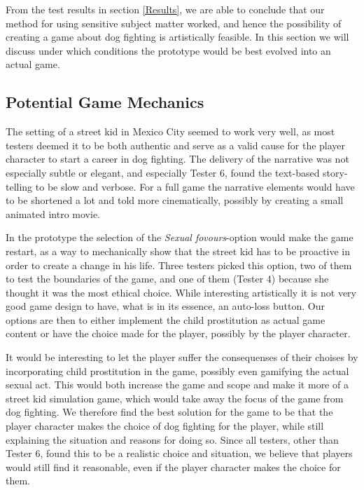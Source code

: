 From the test results in section \ref{Results}, we are able to conclude that our method for using sensitive subject matter worked, and hence the possibility of creating a game about dog fighting is artistically feasible. In this section we will discuss under which conditions the prototype would be best evolved into an actual game.\

\subsection{Potential Game Mechanics}
The setting of a street kid in Mexico City seemed to work very well, as most testers deemed it to be both authentic and serve as a valid cause for the player character to start a career in dog fighting. The delivery of the narrative was not especially subtle or elegant, and especially Tester 6, found the text-based story-telling to be slow and verbose. For a full game the narrative elements would have to be shortened a lot and told more cinematically, possibly by creating a small animated intro movie. \

In the prototype the selection of the \textit{Sexual fovours}-option would make the game restart, as a way to mechanically show that the street kid has to be proactive in order to create a change in his life. Three testers picked this option, two of them to test the boundaries of the game, and one of them (Tester 4) because she thought it was the most ethical choice. While interesting artistically it is not very good game design to have, what is in its essence, an auto-loss button. Our options are then to either implement the child prostitution as actual game content or have the choice made for the player, possibly by the player character.\

It would be interesting to let the player suffer the consequenses of their choises by incorporating child prostitution in the game, possibly even gamifying the actual sexual act. This would both increase the game and scope and make it more of a street kid simulation game, which would take away the focus of the game from dog fighting. We therefore find the best solution for the game to be that the player character makes the choice of dog fighting for the player, while still explaining the situation and reasons for doing so. Since all testers, other than Tester 6, found this to be a realistic choice and situation, we believe that players would still find it reasonable, even if the player character makes the choice for them.\

